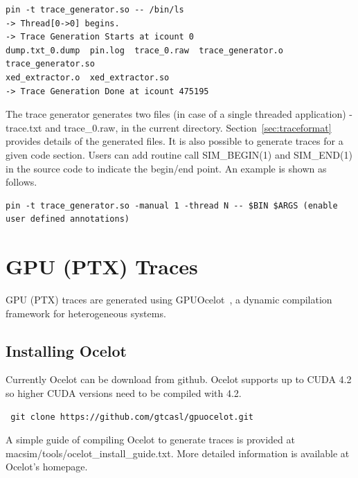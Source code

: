 \begin{Verbatim}
pin -t trace_generator.so -- /bin/ls
-> Thread[0->0] begins.
-> Trace Generation Starts at icount 0
dump.txt_0.dump  pin.log  trace_0.raw  trace_generator.o  trace_generator.so  
xed_extractor.o  xed_extractor.so
-> Trace Generation Done at icount 475195
\end{Verbatim}

The trace generator generates two files (in case of a single threaded
application) - trace.txt and trace\_0.raw, in the current directory.
Section~\ref{sec:traceformat} provides details of the generated files.
It is also possible to generate traces for a given code section.
Users can add routine call SIM\_BEGIN(1) and SIM\_END(1) in the 
source code to indicate the begin/end point. An example is shown as
follows.

\begin{Verbatim}
pin -t trace_generator.so -manual 1 -thread N -- $BIN $ARGS (enable user defined annotations) 
\end{Verbatim}

\section{GPU (PTX) Traces}
\label{sec:gpu_traces}

GPU (PTX) traces are generated using GPUOcelot~\cite{ocelot}, a dynamic compilation
framework for heterogeneous systems. 


\subsection{Installing Ocelot}

Currently Ocelot can be download from github. Ocelot supports up to
CUDA 4.2 so higher CUDA versions need to be compiled with 4.2. 

\begin{Verbatim}
 git clone https://github.com/gtcasl/gpuocelot.git
\end{Verbatim}

A simple guide of compiling Ocelot to generate traces is provided 
at macsim/tools/ocelot\_install\_guide.txt. 
More detailed information is available at Ocelot's homepage. 


